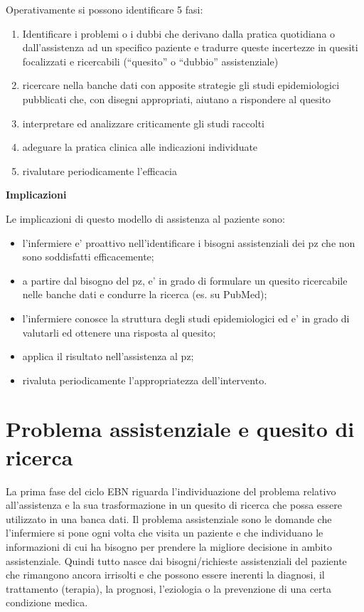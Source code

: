 \documentclass[]{book}
\begin{document}
Operativamente si possono identificare 5 fasi:

\begin{enumerate}
\def\labelenumi{\arabic{enumi})}
\item
  Identificare i problemi o i dubbi che derivano dalla pratica quotidiana o dall'assistenza ad un specifico paziente e tradurre queste incertezze in quesiti focalizzati e ricercabili (``quesito'' o ``dubbio'' assistenziale)
\item
  ricercare nella banche dati con apposite strategie gli studi epidemiologici pubblicati che, con disegni appropriati, aiutano a rispondere al quesito
\item
  interpretare ed analizzare criticamente gli studi raccolti
\item
  adeguare la pratica clinica alle indicazioni individuate
\item
  rivalutare periodicamente l'efficacia
\end{enumerate}

\textbf{Implicazioni}

Le implicazioni di questo modello di assistenza al paziente sono:

\begin{itemize}
\item
  l'infermiere e' proattivo nell'identificare i bisogni assistenziali dei pz che non sono soddisfatti efficacemente;
\item
  a partire dal bisogno del pz, e' in grado di formulare un quesito ricercabile nelle banche dati e condurre la ricerca (es. su PubMed);
\item
  l'infermiere conosce la struttura degli studi epidemiologici ed e' in grado di valutarli ed ottenere una risposta al quesito;
\item
  applica il risultato nell'assistenza al pz;
\item
  rivaluta periodicamente l'appropriatezza dell'intervento.
\end{itemize}

\hypertarget{problema-assistenziale-e-quesito-di-ricerca}{%
\section{Problema assistenziale e quesito di ricerca}\label{problema-assistenziale-e-quesito-di-ricerca}}

La prima fase del ciclo EBN riguarda l'individuazione del problema relativo all'assistenza e la sua trasformazione in un quesito di ricerca che possa essere utilizzato in una banca dati. Il problema assistenziale sono le domande che l'infermiere si pone ogni volta che visita un paziente e che individuano le informazioni di cui ha bisogno per prendere la migliore decisione in ambito assistenziale. Quindi tutto nasce dai bisogni/richieste assistenziali del paziente che rimangono ancora irrisolti e che possono essere inerenti la diagnosi, il trattamento (terapia), la prognosi, l'eziologia o la prevenzione di una certa condizione medica.
\end{document}
